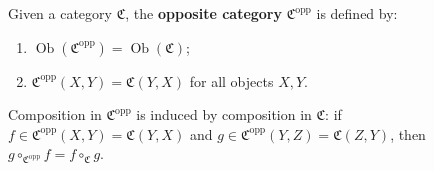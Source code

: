 Given a category $\mathfrak{C}$, the \textbf{opposite category} $\mathfrak{C}^{\text{opp}}$ is defined by:

\begin{enumerate}
\item $\operatorname{Ob}(\mathfrak{C}^{\text{opp}}) = \operatorname{Ob}(\mathfrak{C})$;
\item $\mathfrak{C}^{\text{opp}}(X, Y) = \mathfrak{C}(Y, X)$ for all objects $X, Y$.
\end{enumerate}

Composition in $\mathfrak{C}^{\text{opp}}$ is induced by composition in $\mathfrak{C}$: if $f \in \mathfrak{C}^{\text{opp}}(X, Y) = \mathfrak{C}(Y, X)$ and $g \in \mathfrak{C}^{\text{opp}}(Y, Z) = \mathfrak{C}(Z, Y)$, then $g \circ_{\mathfrak{C}^{\text{opp}}} f = f \circ_{\mathfrak{C}} g$.

